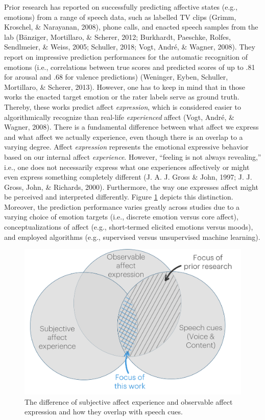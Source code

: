 \documentclass[
  english,
  man,floatsintext]{apa6}
\begin{document}
Prior research has reported on successfully predicting affective states (e.g., emotions) from a range of speech data, such as labelled TV clips (Grimm, Kroschel, \& Narayanan, 2008), phone calls, and enacted speech samples from the lab (Bänziger, Mortillaro, \& Scherer, 2012; Burkhardt, Paeschke, Rolfes, Sendlmeier, \& Weiss, 2005; Schuller, 2018; Vogt, André, \& Wagner, 2008). They report on impressive prediction performances for the automatic recognition of emotions (i.e., correlations between true scores and predicted scores of up to .81 for arousal and .68 for valence predictions) (Weninger, Eyben, Schuller, Mortillaro, \& Scherer, 2013). However, one has to keep in mind that in those works the enacted target emotion or the rater labels serve as ground truth. Thereby, these works predict affect \emph{expression}, which is considered easier to algorithmically recognize than real-life \emph{experienced} affect (Vogt, André, \& Wagner, 2008). There is a fundamental difference between what affect we express and what affect we actually experience, even though there is an overlap to a varying degree. Affect \emph{expression} represents the emotional expressive behavior based on our internal affect \emph{experience}. However, ``feeling is not always revealing,'' i.e., one does not necessarily express what one experiences affectively or might even express something completely different (J. A. J. Gross \& John, 1997; J. J. Gross, John, \& Richards, 2000). Furthermore, the way one expresses affect might be perceived and interpreted differently. Figure \ref{fig:experiencevsexpression} depicts this distinction. Moreover, the prediction performance varies greatly across studies due to a varying choice of emotion targets (i.e., discrete emotion versus core affect), conceptualizations of affect (e.g., short-termed elicited emotions versus moods), and employed algorithms (e.g., supervised versus unsupervised machine learning).

\begin{figure}

{\centering \includegraphics[width=0.75\linewidth]{../figures/experience_vs_expression} 

}

\caption[Feature importance]{The difference of subjective affect experience and observable affect expression and how they overlap with speech cues.}\label{fig:experiencevsexpression}
\end{figure}
\end{document}
